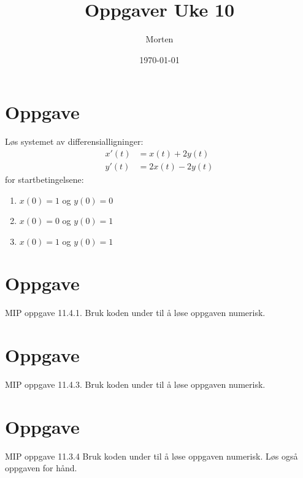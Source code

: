 \documentclass{amsart}
\theoremstyle{definition}
\theoremstyle{remark}
\numberwithin{equation}{section}
\begin{document}
\title{Oppgaver Uke 10}
\author{Morten}
\date{\today}
\maketitle

% 
% 
% 
\section{Oppgave}
Løs systemet av differensialligninger:
\begin{align*}
  x'(t) &= x(t) + 2y(t)\\
  y'(t) &= 2x(t) - 2y(t)
\end{align*}
for startbetingelsene:
\begin{enumerate}
  \item $x(0) = 1$ og $y(0) = 0$
  \item $x(0) = 0$ og $y(0) = 1$
  \item $x(0) = 1$ og $y(0) = 1$
\end{enumerate}

\section{Oppgave}
MIP oppgave 11.4.1. Bruk koden under til å løse oppgaven numerisk.

\section{Oppgave}
MIP oppgave 11.4.3. Bruk koden under til å løse oppgaven numerisk.

\section{Oppgave}
MIP oppgave 11.3.4 Bruk koden under til å løse oppgaven numerisk. Løs også oppgaven for hånd.
\end{document}
